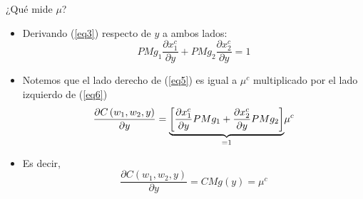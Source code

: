 \documentclass{beamer}
\theoremstyle{definition}
\begin{document}
\begin{frame}{¿Qué mide $\mu$?}
\begin{itemize}
\item Derivando (\ref{eq3}) respecto de $y$ a ambos lados:
\begin{equation}
PMg_{1}\frac{\partial x_{1}^{c}}{\partial y}+PMg_{2}\frac{\partial x_{2}^{c}}{\partial y}=1 \label{eq6}
\end{equation}
\item Notemos que el lado derecho de (\ref{eq5}) es igual a $\mu^c$ multiplicado por el lado izquierdo de (\ref{eq6})
\begin{equation*}
\frac{\partial C\left( w_{1},w_{2},y\right) }{\partial y}=\underset{=1}{%
\underbrace{\left[ \frac{\partial x_{1}^{c}}{\partial y}PMg_{1}+\frac{%
\partial x_{2}^{c}}{\partial y}PMg_{2}\right] }}\mu ^{c}
\end{equation*}
\item Es decir,
\begin{equation*}
\frac{\partial C\left( w_{1},w_{2},y\right) }{\partial y}=CMg(y)=\mu^{c} 
\end{equation*}
\end{itemize}
\end{frame}


\end{document}
